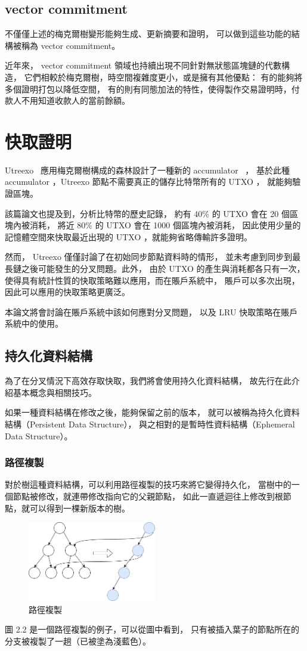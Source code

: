 \subsection{vector commitment}

不僅僅上述的梅克爾樹變形能夠生成、更新摘要和證明，
可以做到這些功能的結構被稱為 vector commitment\cite{catalano2013vector}。

近年來， vector commitment 領域也持續出現不同針對無狀態區塊鏈的代數構造，
它們相較於梅克爾樹，時空間複雜度更小，或是擁有其他優點：
有的能夠將多個證明打包以降低空間\cite{boneh2019batching}，
有的則有同態加法的特性，使得製作交易證明時，付款人不用知道收款人的當前餘額\cite{chepurnoy2018edrax}。

\section{快取證明}

Utreexo~\cite{dryja2019utreexo} 應用梅克爾樹構成的森林設計了一種新的 accumulator ~\cite{benaloh1993one}，
基於此種 accumulator ，Utreexo 節點不需要真正的儲存比特幣所有的 UTXO ，
就能夠驗證區塊。

該篇論文也提及到，分析比特幣的歷史記錄，
約有 40\% 的 UTXO 會在 20 個區塊內被消耗，
將近 80\% 的 UTXO 會在 1000 個區塊內被消耗，
因此使用少量的記憶體空間來快取最近出現的 UTXO ，就能夠省略傳輸許多證明。

然而， Utreexo 僅僅討論了在初始同步節點資料時的情形，
並未考慮到同步到最長鏈之後可能發生的分叉問題。此外，
由於 UTXO 的產生與消耗都各只有一次，
使得具有統計性質的快取策略難以應用，而在賬戶系統中，
賬戶可以多次出現，因此可以應用的快取策略更廣泛。

本論文將會討論在賬戶系統中該如何應對分叉問題，
以及 LRU 快取策略在賬戶系統中的使用。

\subsection{持久化資料結構}

為了在分叉情況下高效存取快取，我們將會使用持久化資料結構，
故先行在此介紹基本概念與相關技巧。

如果一種資料結構在修改之後，能夠保留之前的版本，
就可以被稱為持久化資料結構\cite{driscoll1986making}（Persistent Data Structure），
與之相對的是暫時性資料結構（Ephemeral Data Structure）。

\subsubsection{路徑複製}
對於樹這種資料結構，可以利用路徑複製的技巧來將它變得持久化，
當樹中的一個節點被修改，就連帶修改指向它的父親節點，
如此一直遞迴往上修改到根節點，就可以得到一棵新版本的樹。

\begin{figure}[ht]
\centerline{\includegraphics[width=0.5\textwidth]{../images/路徑複製.png}}
\caption{路徑複製}
\end{figure}

圖 2.2 是一個路徑複製的例子，可以從圖中看到，
只有被插入葉子的節點所在的分支被複製了一趟（已被塗為淺藍色）。
